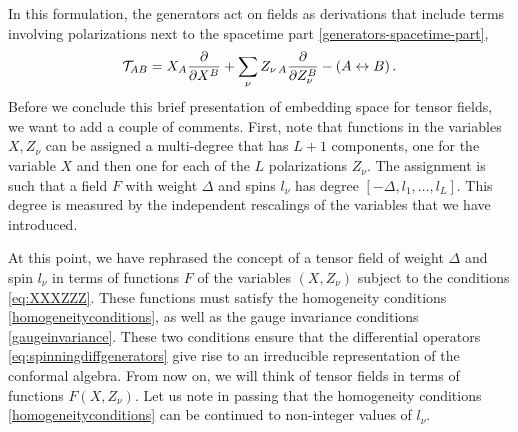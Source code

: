\documentclass{article}
\begin{document}
In this formulation, the generators act on fields as derivations that include terms involving polarizations next to the spacetime part \eqref{generators-spacetime-part}, 
\begin{equation}
    \mathcal{T}_{AB}=X_A\pdv{X^B}+\sum_\nu Z_{\nu\,A}\pdv{Z^{B}_\nu} - 
    (A\leftrightarrow B)\,.
    \label{eq:spinningdiffgenerators}
\end{equation}
Before we conclude this brief presentation of embedding space for tensor fields,
we want to add a couple of comments. First, note that functions in the variables
$X, Z_\nu$ can be assigned a multi-degree that has $L+1$ components, one for 
the variable $X$ and then one for each of the $L$ polarizations $Z_\nu$. The assignment 
is such that a field $F$ with weight $\Delta$ and spins $l_\nu$ has degree $[-\Delta,
l_1, \dots, l_L]$. This degree is measured by the independent rescalings of the 
variables that we have introduced. 
\smallskip 

At this point, we have rephrased the concept of a tensor field of weight $\Delta$ and 
spin $l_\nu$ in terms of functions $F$ of the variables $(X,Z_\nu)$ subject to the 
conditions \eqref{eq:XXXZZZ}. These functions must satisfy the homogeneity conditions
\eqref{homogeneityconditions}, as well as the gauge invariance conditions 
\eqref{gaugeinvariance}. These two conditions ensure that the differential operators 
\eqref{eq:spinningdiffgenerators} give rise to an irreducible representation of the 
conformal algebra. From now on, we will think of tensor fields in terms of functions 
$F(X,Z_\nu)$. Let us note in passing that the homogeneity conditions 
\eqref{homogeneityconditions} can be continued to non-integer values of $l_\nu$. 
\smallskip 
\end{document}
